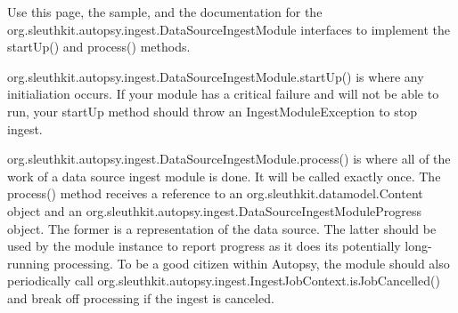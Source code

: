 \begin{DoxyEnumerate}
\item Use this page, the sample, and the documentation for the org.\+sleuthkit.\+autopsy.\+ingest.\+Data\+Source\+Ingest\+Module interfaces to implement the start\+Up() and process() methods.
\begin{DoxyItemize}
\item org.\+sleuthkit.\+autopsy.\+ingest.\+Data\+Source\+Ingest\+Module.\+start\+Up() is where any initialiation occurs. If your module has a critical failure and will not be able to run, your start\+Up method should throw an Ingest\+Module\+Exception to stop ingest.
\item org.\+sleuthkit.\+autopsy.\+ingest.\+Data\+Source\+Ingest\+Module.\+process() is where all of the work of a data source ingest module is done. It will be called exactly once. The process() method receives a reference to an org.\+sleuthkit.\+datamodel.\+Content object and an org.\+sleuthkit.\+autopsy.\+ingest.\+Data\+Source\+Ingest\+Module\+Progress object. The former is a representation of the data source. The latter should be used by the module instance to report progress as it does its potentially long-\/running processing. To be a good citizen within Autopsy, the module should also periodically call org.\+sleuthkit.\+autopsy.\+ingest.\+Ingest\+Job\+Context.\+is\+Job\+Cancelled() and break off processing if the ingest is canceled.
\end{DoxyItemize}
\end{DoxyEnumerate}

